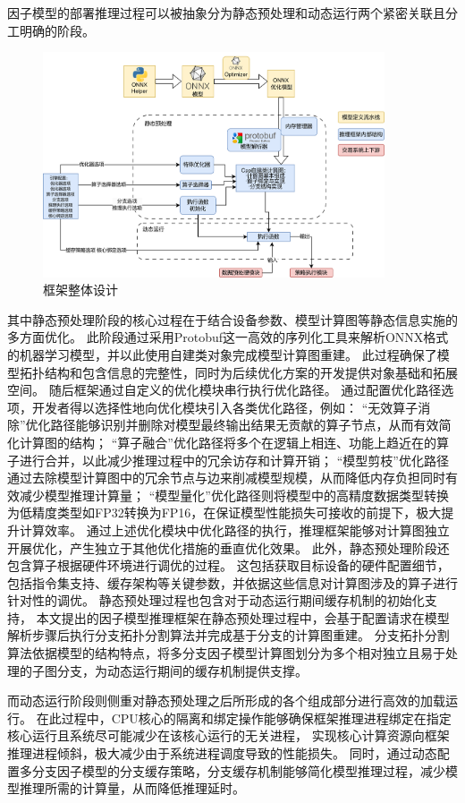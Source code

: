 因子模型的部署推理过程可以被抽象分为静态预处理和动态运行两个紧密关联且分工明确的阶段。
\begin{figure}[h]
    \centering
    \includegraphics[width=0.9\textwidth]{image/chap03/cnframe.png}
    \caption{框架整体设计}
    \label{fig:cnframe}
\end{figure}
其中静态预处理阶段的核心过程在于结合设备参数、模型计算图等静态信息实施的多方面优化。
此阶段通过采用Protobuf这一高效的序列化工具来解析ONNX格式的机器学习模型，并以此使用自建类对象完成模型计算图重建。
此过程确保了模型拓扑结构和包含信息的完整性，同时为后续优化方案的开发提供对象基础和拓展空间。
随后框架通过自定义的优化模块串行执行优化路径。
通过配置优化路径选项，开发者得以选择性地向优化模块引入各类优化路径，例如：
“无效算子消除”优化路径能够识别并删除对模型最终输出结果无贡献的算子节点，从而有效简化计算图的结构；
“算子融合”优化路径将多个在逻辑上相连、功能上趋近在的算子进行合并，以此减少推理过程中的冗余访存和计算开销；
“模型剪枝”优化路径通过去除模型计算图中的冗余节点与边来削减模型规模，从而降低内存负担同时有效减少模型推理计算量；
“模型量化”优化路径则将模型中的高精度数据类型转换为低精度类型如FP32转换为FP16，在保证模型性能损失可接收的前提下，极大提升计算效率。
通过上述优化模块中优化路径的执行，推理框架能够对计算图独立开展优化，产生独立于其他优化措施的垂直优化效果。
此外，静态预处理阶段还包含算子根据硬件环境进行调优的过程。
这包括获取目标设备的硬件配置细节，包括指令集支持、缓存架构等关键参数，并依据这些信息对计算图涉及的算子进行针对性的调优。
静态预处理过程也包含对于动态运行期间缓存机制的初始化支持，
本文提出的因子模型推理框架在静态预处理过程中，会基于配置请求在模型解析步骤后执行分支拓扑分割算法并完成基于分支的计算图重建。
分支拓扑分割算法依据模型的结构特点，将多分支因子模型计算图划分为多个相对独立且易于处理的子图分支，为动态运行期间的缓存机制提供支撑。

而动态运行阶段则侧重对静态预处理之后所形成的各个组成部分进行高效的加载运行。
在此过程中，CPU核心的隔离和绑定操作能够确保框架推理进程绑定在指定核心运行且系统尽可能减少在该核心运行的无关进程，
实现核心计算资源向框架推理进程倾斜，极大减少由于系统进程调度导致的性能损失。
同时，通过动态配置多分支因子模型的分支缓存策略，分支缓存机制能够简化模型推理过程，减少模型推理所需的计算量，从而降低推理延时。

